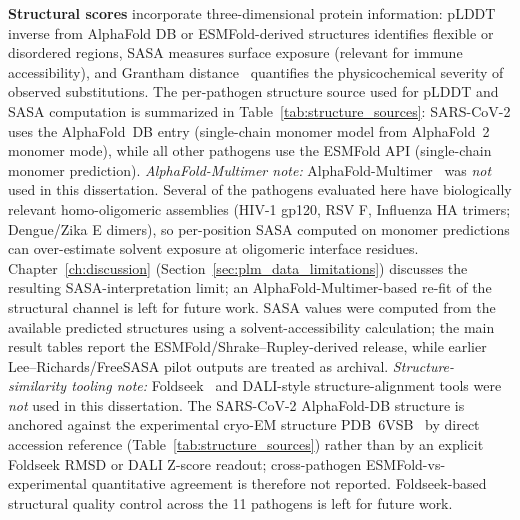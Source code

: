 \textbf{Structural scores} incorporate three-dimensional protein information: pLDDT inverse from AlphaFold DB or ESMFold-derived structures identifies flexible or disordered regions, SASA measures surface exposure (relevant for immune accessibility), and Grantham distance~\cite{grantham1974amino} quantifies the physicochemical severity of observed substitutions. The per-pathogen structure source used for pLDDT and SASA computation is summarized in Table~\ref{tab:structure_sources}: SARS-CoV-2 uses the AlphaFold~DB entry (single-chain monomer model from AlphaFold~2 monomer mode), while all other pathogens use the ESMFold API (single-chain monomer prediction). \textit{AlphaFold-Multimer note:} AlphaFold-Multimer~\cite{evans2021af2multimer} was \emph{not} used in this dissertation. Several of the pathogens evaluated here have biologically relevant homo-oligomeric assemblies (HIV-1 gp120, RSV F, Influenza HA trimers; Dengue/Zika E dimers), so per-position SASA computed on monomer predictions can over-estimate solvent exposure at oligomeric interface residues. Chapter~\ref{ch:discussion} (Section~\ref{sec:plm_data_limitations}) discusses the resulting SASA-interpretation limit; an AlphaFold-Multimer-based re-fit of the structural channel is left for future work.
SASA values were computed from the available predicted structures using a solvent-accessibility calculation; the main result tables report the ESMFold/Shrake--Rupley-derived release, while earlier Lee--Richards/FreeSASA pilot outputs are treated as archival. \textit{Structure-similarity tooling note:} Foldseek~\cite{vankempen2024foldseek} and DALI-style structure-alignment tools were \emph{not} used in this dissertation. The SARS-CoV-2 AlphaFold-DB structure is anchored against the experimental cryo-EM structure PDB~6VSB~\cite{wrapp2020cryo} by direct accession reference (Table~\ref{tab:structure_sources}) rather than by an explicit Foldseek RMSD or DALI Z-score readout; cross-pathogen ESMFold-vs-experimental quantitative agreement is therefore not reported. Foldseek-based structural quality control across the 11 pathogens is left for future work.

